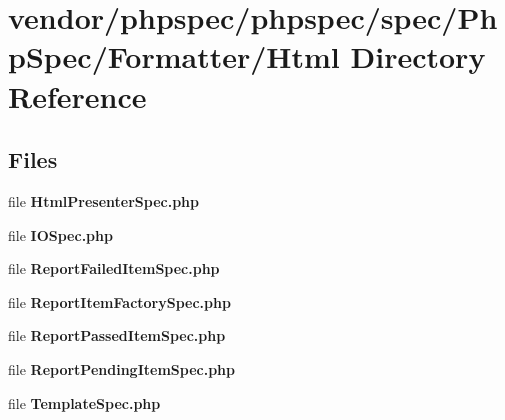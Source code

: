 \section{vendor/phpspec/phpspec/spec/\+Php\+Spec/\+Formatter/\+Html Directory Reference}
\label{dir_f8a210c103b017b8b4677660db927fb1}
\subsection*{Files}
\begin{DoxyCompactItemize}
\item 
file {\bf Html\+Presenter\+Spec.\+php}
\item 
file {\bf I\+O\+Spec.\+php}
\item 
file {\bf Report\+Failed\+Item\+Spec.\+php}
\item 
file {\bf Report\+Item\+Factory\+Spec.\+php}
\item 
file {\bf Report\+Passed\+Item\+Spec.\+php}
\item 
file {\bf Report\+Pending\+Item\+Spec.\+php}
\item 
file {\bf Template\+Spec.\+php}
\end{DoxyCompactItemize}
